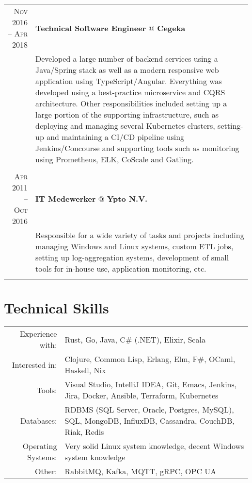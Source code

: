 \documentclass[a4paper,10pt]{article}
\begin{document}
\begin{tabular}{r|p{11cm}}
	\textsc{Nov 2016 – Apr 2018} & \textbf{Technical Software Engineer} @ \textbf{Cegeka} \\ 
	& \footnotesize{Developed a large number of backend services using a Java/Spring stack as well as a modern responsive web application using TypeScript/Angular. Everything was developed using a best-practice microservice and CQRS architecture. Other responsibilities included setting up a large portion of the supporting infrastructure, such as deploying and managing several Kubernetes clusters, setting-up and maintaining a CI/CD pipeline using Jenkins/Concourse and supporting tools such as monitoring using Prometheus, ELK, CoScale and Gatling.} \\
	\multicolumn{2}{c}{} \\

        
	\textsc{Apr 2011 – Oct 2016} & \textbf{IT Medewerker} @ \textbf{Ypto N.V.} \\
	& \footnotesize{Responsible for a wide variety of tasks and projects including managing Windows and Linux systems, custom ETL jobs, setting up log-aggregation systems, development of small tools for in-house use, application monitoring, etc.} \\
	\multicolumn{2}{c}{} \\
\end{tabular}

\section{\textcolor{awesome-red}{Tec}hnical Skills}
\begin{tabular}{rp{11cm}}
Experience with:& Rust, Go, Java, C\# (.NET), Elixir, Scala\\
Interested in:& Clojure, Common Lisp, Erlang, Elm, F\#, OCaml, Haskell, Nix\\
Tools:& Visual Studio, IntelliJ IDEA, Git, Emacs, Jenkins, Jira, Docker, Ansible, Terraform, Kubernetes\\
Databases:& RDBMS (SQL Server, Oracle, Postgres, MySQL), SQL, MongoDB, InfluxDB, Cassandra, CouchDB, Riak, Redis\\
Operating Systems:& Very solid Linux system knowledge, decent Windows system knowledge\\
Other:& RabbitMQ, Kafka, MQTT, gRPC, OPC UA
\end{tabular}
\newline
\newline
\end{document}

